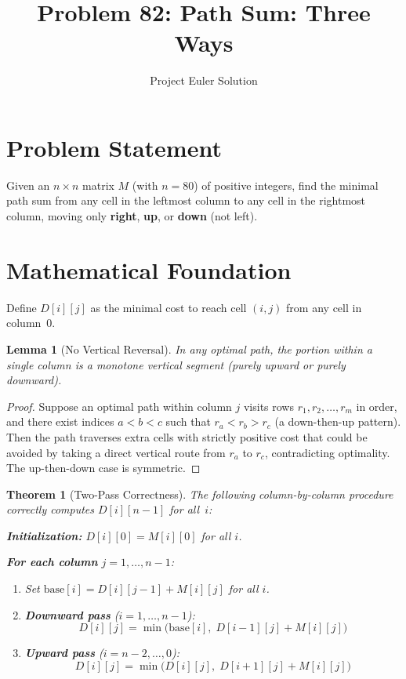 \documentclass[12pt]{article}
\title{Problem 82: Path Sum: Three Ways}
\author{Project Euler Solution}
\date{}
\newtheorem{theorem}{Theorem}
\newtheorem{lemma}{Lemma}
\begin{document}
\maketitle

\section{Problem Statement}

Given an $n \times n$ matrix $M$ (with $n = 80$) of positive integers, find the minimal path sum from any cell in the leftmost column to any cell in the rightmost column, moving only \textbf{right}, \textbf{up}, or \textbf{down} (not left).

\section{Mathematical Foundation}

Define $D[i][j]$ as the minimal cost to reach cell $(i,j)$ from any cell in column~0.

\begin{lemma}[No Vertical Reversal]
In any optimal path, the portion within a single column is a monotone vertical segment (purely upward or purely downward).
\end{lemma}

\begin{proof}
Suppose an optimal path within column $j$ visits rows $r_1, r_2, \ldots, r_m$ in order, and there exist indices $a < b < c$ such that $r_a < r_b > r_c$ (a down-then-up pattern). Then the path traverses extra cells with strictly positive cost that could be avoided by taking a direct vertical route from $r_a$ to $r_c$, contradicting optimality. The up-then-down case is symmetric.
\end{proof}

\begin{theorem}[Two-Pass Correctness]
The following column-by-column procedure correctly computes $D[i][n-1]$ for all~$i$:

\textbf{Initialization:} $D[i][0] = M[i][0]$ for all $i$.

\textbf{For each column} $j = 1, \ldots, n-1$:
\begin{enumerate}
    \item Set $\mathrm{base}[i] = D[i][j-1] + M[i][j]$ for all $i$.
    \item \textbf{Downward pass} ($i = 1, \ldots, n-1$):
    \[ D[i][j] = \min\bigl(\mathrm{base}[i],\; D[i-1][j] + M[i][j]\bigr) \]
    \item \textbf{Upward pass} ($i = n-2, \ldots, 0$):
    \[ D[i][j] = \min\bigl(D[i][j],\; D[i+1][j] + M[i][j]\bigr) \]
\end{enumerate}
\end{theorem}
\end{document}

